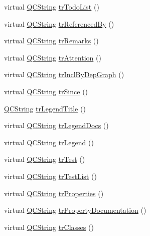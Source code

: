 \begin{DoxyCompactItemize}
\item 
virtual \hyperlink{class_q_c_string}{Q\+C\+String} \hyperlink{class_translator_spanish_a6228a3cd135be2558bd639e356bfb745}{tr\+Todo\+List} ()
\item 
virtual \hyperlink{class_q_c_string}{Q\+C\+String} \hyperlink{class_translator_spanish_ae5f87400149e3a1cd0019c9869846235}{tr\+Referenced\+By} ()
\item 
virtual \hyperlink{class_q_c_string}{Q\+C\+String} \hyperlink{class_translator_spanish_a28ebddc524ebc19b9902f9218c53f562}{tr\+Remarks} ()
\item 
virtual \hyperlink{class_q_c_string}{Q\+C\+String} \hyperlink{class_translator_spanish_afb701ffea0df179e14acdf2d957e5b68}{tr\+Attention} ()
\item 
virtual \hyperlink{class_q_c_string}{Q\+C\+String} \hyperlink{class_translator_spanish_a43d0761a299b6f2816c41715020e64a9}{tr\+Incl\+By\+Dep\+Graph} ()
\item 
virtual \hyperlink{class_q_c_string}{Q\+C\+String} \hyperlink{class_translator_spanish_ae520843848c76c9e0df1a49ba878b1f0}{tr\+Since} ()
\item 
\hyperlink{class_q_c_string}{Q\+C\+String} \hyperlink{class_translator_spanish_ae36cf2fbe0f335d87fa57d37d8a45e67}{tr\+Legend\+Title} ()
\item 
virtual \hyperlink{class_q_c_string}{Q\+C\+String} \hyperlink{class_translator_spanish_a4290436e8ccc955b47ade0df3dc79c77}{tr\+Legend\+Docs} ()
\item 
virtual \hyperlink{class_q_c_string}{Q\+C\+String} \hyperlink{class_translator_spanish_a99875d1ae2378f0d0d011bf4fcea85bf}{tr\+Legend} ()
\item 
virtual \hyperlink{class_q_c_string}{Q\+C\+String} \hyperlink{class_translator_spanish_a6ededeae8a2ac4c0283f2ccd7000ca4a}{tr\+Test} ()
\item 
virtual \hyperlink{class_q_c_string}{Q\+C\+String} \hyperlink{class_translator_spanish_a24671621c3139ae24e7c28d33c5fff48}{tr\+Test\+List} ()
\item 
virtual \hyperlink{class_q_c_string}{Q\+C\+String} \hyperlink{class_translator_spanish_a2e4d6890f0641d6170352e623ee2f962}{tr\+Properties} ()
\item 
virtual \hyperlink{class_q_c_string}{Q\+C\+String} \hyperlink{class_translator_spanish_a8ad1a76b72d78fd64e21365e95a3d579}{tr\+Property\+Documentation} ()
\item 
virtual \hyperlink{class_q_c_string}{Q\+C\+String} \hyperlink{class_translator_spanish_a6ebac01c574f3c47c79f872fc1531719}{tr\+Classes} ()

\end{DoxyCompactItemize}
